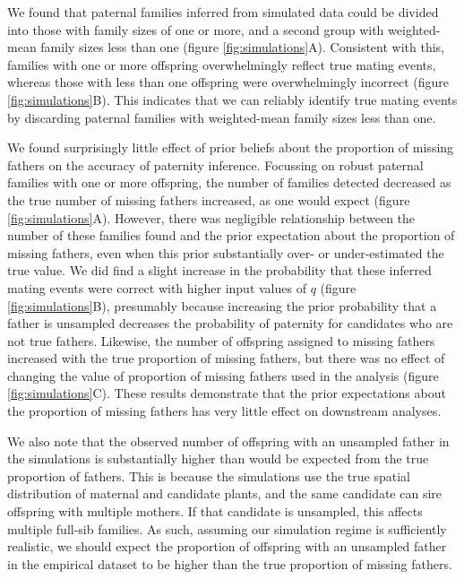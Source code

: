 \documentclass[10pt, a4paper, twocolumn]{article} %
\begin{document}
We found that paternal families inferred from simulated data could be divided into those with family sizes of one or more, and a second group with weighted-mean family sizes less than one (figure \ref{fig:simulations}A).
Consistent with this, families with one or more offspring overwhelmingly reflect true mating events, whereas those with less than one offspring were overwhelmingly incorrect (figure \ref{fig:simulations}B).
This indicates that we can reliably identify true mating events by discarding paternal families with weighted-mean family sizes less than one.

We found surprisingly little effect of prior beliefs about the proportion of missing fathers on the accuracy of paternity inference.
Focussing on robust paternal families with one or more offspring, the number of families detected decreased as the true number of missing fathers increased, as one would expect (figure \ref{fig:simulations}A).
However, there was negligible relationship between the number of these families found and the prior expectation about the proportion of missing fathers, even when this prior substantially over- or under-estimated the true value.
We did find a slight increase in the probability that these inferred mating events were correct with higher input values of $q$ (figure \ref{fig:simulations}B), presumably because increasing the prior probability that a father is unsampled decreases the probability of paternity for candidates who are not true fathers.
Likewise, the number of offspring assigned to missing fathers increased with the true proportion of missing fathers, but there was no effect of changing the value of proportion of missing fathers used in the analysis (figure \ref{fig:simulations}C).
These results demonstrate that the prior expectations about the proportion of missing fathers has very little effect on downstream analyses.

We also note that the observed number of offspring with an unsampled father in the simulations is substantially higher than would be expected from the true proportion of fathers.
This is because the simulations use the true spatial distribution of maternal and candidate plants, and the same candidate can sire offspring with multiple mothers.
If that candidate is unsampled, this affects multiple full-sib families.
As such, assuming our simulation regime is sufficiently realistic, we should expect the proportion of offspring with an unsampled father in the empirical dataset to be higher than the true proportion of missing fathers.
\end{document}
